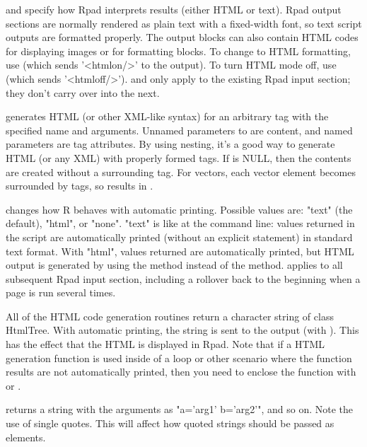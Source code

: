 \begin{Details}\relax
{} and  specify how Rpad
interprets results (either HTML or text). Rpad output sections are normally rendered as plain text with
a fixed-width font, so text script outputs are formatted
properly. The output blocks can also contain HTML codes for
displaying images or for formatting blocks. To change to HTML
formatting, use  (which sends '<htmlon/>' to the output).
To turn HTML mode off, use  (which sends
'<htmloff/>').  and  only apply to the
existing Rpad input section; they don't carry over into the next.

 generates HTML (or other XML-like syntax) for an arbitrary tag
with the specified name and arguments. Unnamed parameters to 
are content, and named parameters are tag attributes. By using nesting,
it's a good way to generate HTML (or any XML) with properly formed
tags. If  is NULL, then the contents are created without a
surrounding tag. For vectors, each vector element becomes surrounded by
tags, so  results in
. 

 changes how R behaves with automatic
printing. Possible
values are: "text" (the default), "html", or "none". "text" is like
at the command line: values returned in the script are automatically printed (without an explicit 
statement) in
standard text format. With "html", values
returned are automatically printed, but HTML output is generated by
using the  method instead of the  method.  applies to all subsequent Rpad input
section, including a rollover back to the beginning when a page is run
several times.
\end{Details}
\begin{Value}
All of the HTML code generation routines return a character string of
class HtmlTree. With automatic printing, the string is sent to the
output (with ). This has the effect that the HTML is
displayed in Rpad. Note that if a HTML generation function is used
inside of a loop or other scenario where the function results are not
automatically printed, then you need to enclose the function with
 or .

 returns a string with the arguments as "a='arg1'
b='arg2'", and so on. Note the use of single quotes. This will affect
how quoted strings should be passed as elements.
\end{Value}
